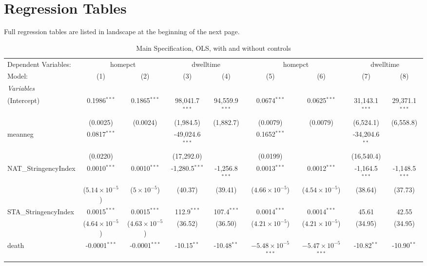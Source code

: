 \documentclass{article}
\begin{document}
\appendix 


  

  \section{Regression Tables}
  Full regression tables are listed in landscape at the beginning of the next page.
  \begin{landscape}
\begin{table}
  \caption{Main Specification, OLS, with and without controls}\label{tab:olsfull}
\begin{tabular}{lcccccccc}
  \tabularnewline\midrule\midrule
  Dependent Variables:&\multicolumn{2}{c}{homepct}&\multicolumn{2}{c}{dwelltime}&\multicolumn{2}{c}{homepct}&\multicolumn{2}{c}{dwelltime}\\
  Model:&(1) & (2) & (3) & (4) & (5) & (6) & (7) & (8)\\
  \midrule \emph{Variables}&   &   &   &   &   &   &   &  \\
  (Intercept)&0.1986$^{***}$ & 0.1865$^{***}$ & 98,041.7$^{***}$ & 94,559.9$^{***}$ & 0.0674$^{***}$ & 0.0625$^{***}$ & 31,143.1$^{***}$ & 29,371.1$^{***}$\\
    &(0.0025) & (0.0024) & (1,984.5) & (1,882.7) & (0.0079) & (0.0079) & (6,524.1) & (6,558.8)\\
  meanneg&0.0817$^{***}$ &    & -49,024.6$^{***}$ &    & 0.1652$^{***}$ &    & -34,204.6$^{**}$ &   \\
    &(0.0220) &    & (17,292.0) &    & (0.0199) &    & (16,540.4) &   \\
  NAT\_StringencyIndex&0.0010$^{***}$ & 0.0010$^{***}$ & -1,280.5$^{***}$ & -1,256.8$^{***}$ & 0.0013$^{***}$ & 0.0012$^{***}$ & -1,164.5$^{***}$ & -1,148.5$^{***}$\\
    &($5.14\times 10^{-5}$) & ($5\times 10^{-5}$) & (40.37) & (39.41) & ($4.66\times 10^{-5}$) & ($4.54\times 10^{-5}$) & (38.64) & (37.73)\\
  STA\_StringencyIndex&0.0015$^{***}$ & 0.0015$^{***}$ & 112.9$^{***}$ & 107.4$^{***}$ & 0.0014$^{***}$ & 0.0014$^{***}$ & 45.61 & 42.55\\
    &($4.64\times 10^{-5}$) & ($4.63\times 10^{-5}$) & (36.52) & (36.50) & ($4.21\times 10^{-5}$) & ($4.21\times 10^{-5}$) & (34.95) & (34.95)\\
  death&-0.0001$^{***}$ & -0.0001$^{***}$ & -10.15$^{**}$ & -10.48$^{**}$ & $-5.48\times 10^{-5}$$^{***}$ & $-5.47\times 10^{-5}$$^{***}$ & -10.82$^{**}$ & -10.90$^{**}$\\

\end{tabular}
\end{table}
\end{landscape}
\end{document}

